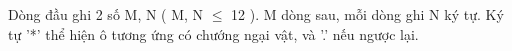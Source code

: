 Dòng đầu ghi 2 số M, N ( M, N  $\le$  12 ). M dòng sau, mỗi dòng ghi N ký tự. Ký tự '*' thể hiện ô tương ứng có chướng ngại vật, và '.' nếu ngược lại.  

\